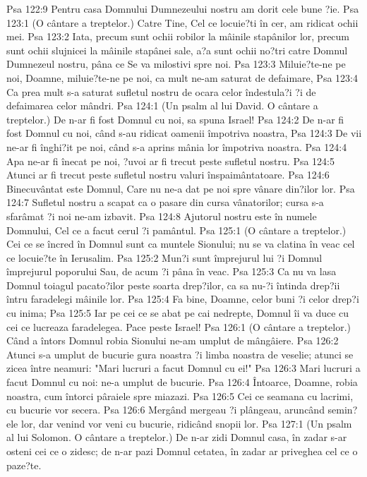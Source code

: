 Psa 122:9  Pentru casa Domnului Dumnezeului nostru am dorit cele bune ?ie.
Psa 123:1  (O cântare a treptelor.) Catre Tine, Cel ce locuie?ti în cer, am ridicat ochii mei.
Psa 123:2  Iata, precum sunt ochii robilor la mâinile stapânilor lor, precum sunt ochii slujnicei la mâinile stapânei sale, a?a sunt ochii no?tri catre Domnul Dumnezeul nostru, pâna ce Se va milostivi spre noi.
Psa 123:3  Miluie?te-ne pe noi, Doamne, miluie?te-ne pe noi, ca mult ne-am saturat de defaimare,
Psa 123:4  Ca prea mult s-a saturat sufletul nostru de ocara celor îndestula?i ?i de defaimarea celor mândri.
Psa 124:1  (Un psalm al lui David. O cântare a treptelor.) De n-ar fi fost Domnul cu noi, sa spuna Israel!
Psa 124:2  De n-ar fi fost Domnul cu noi, când s-au ridicat oamenii împotriva noastra,
Psa 124:3  De vii ne-ar fi înghi?it pe noi, când s-a aprins mânia lor împotriva noastra.
Psa 124:4  Apa ne-ar fi înecat pe noi, ?uvoi ar fi trecut peste sufletul nostru.
Psa 124:5  Atunci ar fi trecut peste sufletul nostru valuri înspaimântatoare.
Psa 124:6  Binecuvântat este Domnul, Care nu ne-a dat pe noi spre vânare din?ilor lor.
Psa 124:7  Sufletul nostru a scapat ca o pasare din cursa vânatorilor; cursa s-a sfarâmat ?i noi ne-am izbavit.
Psa 124:8  Ajutorul nostru este în numele Domnului, Cel ce a facut cerul ?i pamântul.
Psa 125:1  (O cântare a treptelor.) Cei ce se încred în Domnul sunt ca muntele Sionului; nu se va clatina în veac cel ce locuie?te în Ierusalim.
Psa 125:2  Mun?i sunt împrejurul lui ?i Domnul împrejurul poporului Sau, de acum ?i pâna în veac.
Psa 125:3  Ca nu va lasa Domnul toiagul pacato?ilor peste soarta drep?ilor, ca sa nu-?i întinda drep?ii întru faradelegi mâinile lor.
Psa 125:4  Fa bine, Doamne, celor buni ?i celor drep?i cu inima;
Psa 125:5  Iar pe cei ce se abat pe cai nedrepte, Domnul îi va duce cu cei ce lucreaza faradelegea. Pace peste Israel!
Psa 126:1  (O cântare a treptelor.) Când a întors Domnul robia Sionului ne-am umplut de mângâiere.
Psa 126:2  Atunci s-a umplut de bucurie gura noastra ?i limba noastra de veselie; atunci se zicea între neamuri: "Mari lucruri a facut Domnul cu ei!"
Psa 126:3  Mari lucruri a facut Domnul cu noi: ne-a umplut de bucurie.
Psa 126:4  Întoarce, Doamne, robia noastra, cum întorci pâraiele spre miazazi.
Psa 126:5  Cei ce seamana cu lacrimi, cu bucurie vor secera.
Psa 126:6  Mergând mergeau ?i plângeau, aruncând semin?ele lor, dar venind vor veni cu bucurie, ridicând snopii lor.
Psa 127:1  (Un psalm al lui Solomon. O cântare a treptelor.) De n-ar zidi Domnul casa, în zadar s-ar osteni cei ce o zidesc; de n-ar pazi Domnul cetatea, în zadar ar priveghea cel ce o paze?te.
